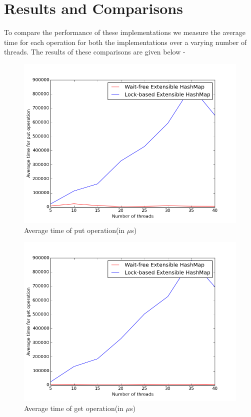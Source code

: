 \documentclass[a4paper,10pt]{article}
\begin{document}
\section{Results and Comparisons}
To compare the performance of these implementations we measure the average time for each operation for both the 
implementations over a varying number of threads. The results of these comparisons are given below -
\begin{figure}[H]
 \includegraphics[width=\linewidth]{put.png}
 \caption{Average time of put operation(in $\mu$s)}
\end{figure}

\begin{figure}[H]
 \includegraphics[width=\linewidth]{get.png}
 \caption{Average time of get operation(in $\mu$s)}
\end{figure}
\end{document}
